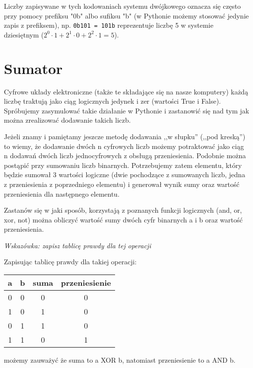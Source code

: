 \documentclass{pdfBooklets}
\begin{document}
Liczby zapisywane w tych kodowaniach systemu dwójkowego oznacza się często przy pomocy prefiksu "0b" albo sufiksu "b" (w Pythonie możemy stosować jedynie  zapis z prefiksem), np. {\tt 0b101 = 101b} reprezentuje liczbę 5 w systemie dziesiętnym ($2^0 \cdot 1 + 2^1 \cdot 0 + 2^2 \cdot 1 = 5$).


\section{Sumator}

Cyfrowe układy elektroniczne (także te składające się na nasze komputery) każdą liczbę traktują jako ciąg logicznych jedynek i zer (wartości True i False).
Spróbujemy zasymulować takie działanie w Pythonie i zastanowić się nad tym jak można zrealizować dodawanie takich liczb.

Jeżeli znamy i pamiętamy jeszcze metodę dodawania ,,w słupku'' (,,pod kreską'') to wiemy, że dodawanie dwóch n cyfrowych liczb możemy potraktować jako ciąg n dodawań dwóch liczb jednocyfrowych z obsługą przeniesienia.
Podobnie można postąpić przy sumowaniu liczb binarnych. Potrzebujemy zatem elementu, który będzie sumował 3 wartości logiczne (dwie pochodzące z sumowanych liczb, jedna z przeniesienia z poprzedniego elementu)
i generował wynik sumy oraz wartość przeniesienia dla następnego elementu.

\begin{Zadanie}{}{}
Zastanów się w jaki sposób, korzystają z poznanych funkcji logicznych (and, or, xor, not) można obliczyć wartość sumy dwóch cyfr binarnych a i b oraz wartość przeniesienia.

\emph{Wskazówka: zapisz tablicę prawdy dla tej operacji}

\begin{teacherOnly}
Zapisując tablicę prawdy dla takiej operacji:

\begin{tabular}{c|c||c|c}
a & b  &  suma & przeniesienie\\
\hline
0 & 0  &  0 & 0\\
1 & 0  &  1 & 0\\
0 & 1  &  1 & 0\\
1 & 1  &  0 & 1\\
\end{tabular}

możemy zauważyć że suma to a XOR b, natomiast przeniesienie to a AND b.
\end{teacherOnly}
\end{Zadanie}
\end{document}
